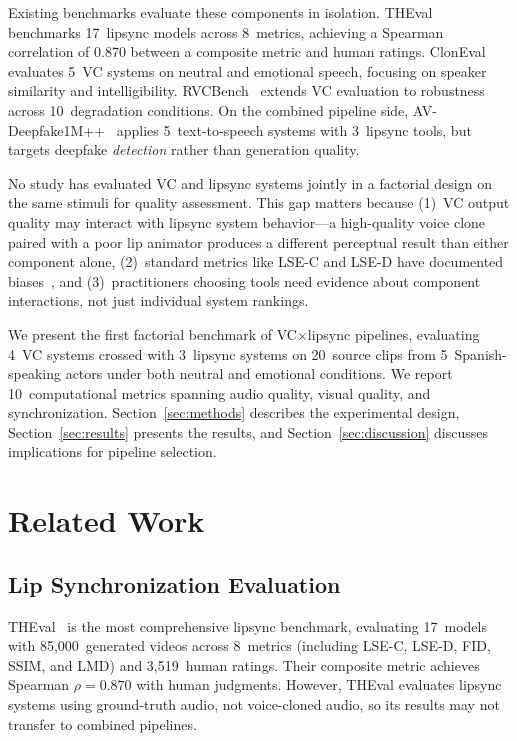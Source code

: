 \documentclass[11pt,a4paper]{article}
\begin{document}
Existing benchmarks evaluate these components in isolation.
THEval~\citep{quignon2025theval} benchmarks 17~lipsync models across 8~metrics, achieving a Spearman correlation of 0.870 between a composite metric and human ratings.
ClonEval~\citep{christop2025cloneval} evaluates 5~VC systems on neutral and emotional speech, focusing on speaker similarity and intelligibility.
RVCBench~\citep{rvcbench2026} extends VC evaluation to robustness across 10~degradation conditions.
On the combined pipeline side, AV-Deepfake1M++~\citep{cai2025avdeepfake} applies 5~text-to-speech systems with 3~lipsync tools, but targets deepfake \emph{detection} rather than generation quality.

No study has evaluated VC and lipsync systems jointly in a factorial design on the same stimuli for quality assessment.
This gap matters because (1)~VC output quality may interact with lipsync system behavior---a high-quality voice clone paired with a poor lip animator produces a different perceptual result than either component alone, (2)~standard metrics like LSE-C and LSE-D have documented biases~\citep{zhang2024perceptual,yaman2024stabilized}, and (3)~practitioners choosing tools need evidence about component interactions, not just individual system rankings.

We present the first factorial benchmark of VC$\times$lipsync pipelines, evaluating 4~VC systems crossed with 3~lipsync systems on 20~source clips from 5~Spanish-speaking actors under both neutral and emotional conditions.
We report 10~computational metrics spanning audio quality, visual quality, and synchronization.
Section~\ref{sec:methods} describes the experimental design, Section~\ref{sec:results} presents the results, and Section~\ref{sec:discussion} discusses implications for pipeline selection.

\section{Related Work}
\label{sec:related}

\subsection{Lip Synchronization Evaluation}

THEval~\citep{quignon2025theval} is the most comprehensive lipsync benchmark, evaluating 17~models with 85,000~generated videos across 8~metrics (including LSE-C, LSE-D, FID, SSIM, and LMD) and 3,519~human ratings.
Their composite metric achieves Spearman $\rho=0.870$ with human judgments.
However, THEval evaluates lipsync systems using ground-truth audio, not voice-cloned audio, so its results may not transfer to combined pipelines.
\end{document}
